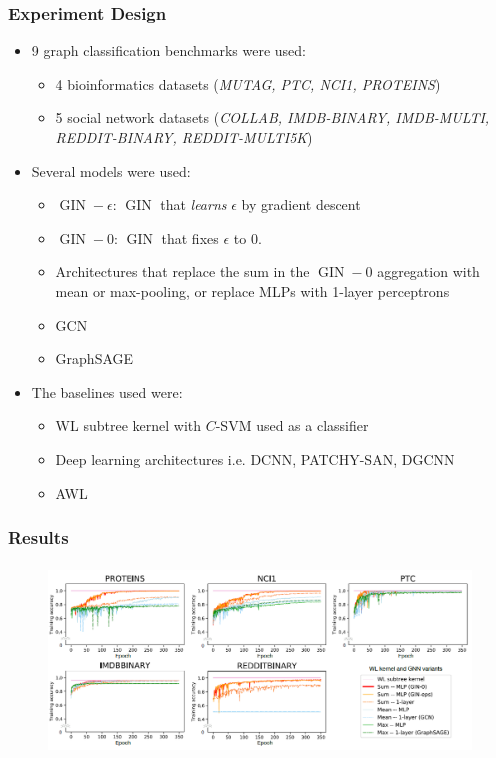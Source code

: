 \documentclass[handout]{beamer}
\DeclareMathOperator{\gin}{GIN}
\begin{document}
\begin{frame}
\frametitle{Experiment Design}

\begin{itemize}
	\item 9 graph classification benchmarks were used:
	\begin{itemize}
		\item 4 bioinformatics datasets ({\it MUTAG, PTC, NCI1, PROTEINS})
		\item 5 social network datasets ({\it COLLAB, IMDB-BINARY, IMDB-MULTI, REDDIT-BINARY, REDDIT-MULTI5K})
	\end{itemize} \pause
	
	\item Several models were used:
	\begin{itemize}
		\item $\gin-\epsilon$: $\gin$ that {\it learns} $\epsilon$ by gradient descent
		\item $\gin-0$: $\gin$ that fixes $\epsilon$ to $0$.
		\item Architectures that replace the sum in the $\gin-0$ aggregation with mean or max-pooling, or replace MLPs with 1-layer perceptrons
		\item GCN
		\item GraphSAGE
	\end{itemize} \pause
	
	\item The baselines used were:
	\begin{itemize}
		\item WL subtree kernel with $C$-SVM used as a classifier
		\item Deep learning architectures i.e. DCNN, PATCHY-SAN, DGCNN
		\item AWL
	\end{itemize}
\end{itemize}

\end{frame}



\begin{frame}
\frametitle{Results}

\begin{figure}[hbt]
  \includegraphics[height=5cm]{fig5.png}
\end{figure}

\end{frame}
\end{document}
